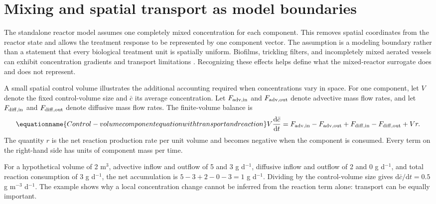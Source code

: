 \section{Mixing and spatial transport as model boundaries}

The standalone reactor model assumes one completely mixed concentration for each component. This removes spatial coordinates from the reactor state and allows the treatment response to be represented by one component vector. The assumption is a modeling boundary rather than a statement that every biological treatment unit is spatially uniform. Biofilms, trickling filters, and incompletely mixed aerated vessels can exhibit concentration gradients and transport limitations \citep{Wik2003,Zhang1994,SadinoRiquelme2023}. Recognizing these effects helps define what the mixed-reactor surrogate does and does not represent.

A small spatial control volume illustrates the additional accounting required when concentrations vary in space. For one component, let $V$ denote the fixed control-volume size and $\bar c$ its average concentration. Let
$F_{\rm adv,in}$ and $F_{\rm adv,out}$ denote advective mass flow rates, and let
$F_{\rm diff,in}$ and $F_{\rm diff,out}$ denote diffusive mass flow rates. The finite-volume balance is
\begin{equation}
\equationname{Control-volume component equation with transport and reaction}
V\frac{\mathrm d\bar c}{\mathrm dt}
=F_{\rm adv,in}-F_{\rm adv,out}
+F_{\rm diff,in}-F_{\rm diff,out}+Vr.
\label{eq:teaching_spatial_control_volume}
\end{equation}
The quantity $r$ is the net reaction production rate per unit volume and becomes negative when the component is consumed. Every term on the right-hand side has units of component mass per time.

For a hypothetical volume of 2 m$^3$, advective inflow and outflow of 5 and 3 g d$^{-1}$, diffusive inflow and outflow of 2 and 0 g d$^{-1}$, and total reaction consumption of 3 g d$^{-1}$, the net accumulation is
$5-3+2-0-3=1$ g d$^{-1}$. Dividing by the control-volume size gives
$\mathrm d\bar c/\mathrm dt=0.5$ g m$^{-3}$ d$^{-1}$. The example shows why a local concentration change cannot be inferred from the reaction term alone: transport can be equally important.

